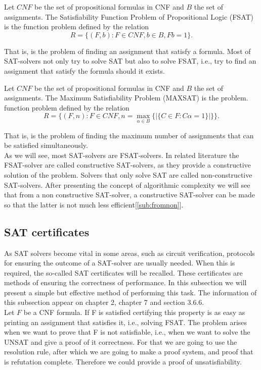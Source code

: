 \begin{definition}
  Let $CNF$ be the set of propositional formulas in CNF and $B$ the set of assignments.  The Satisfiability Function Problem of Propositional Logic (FSAT) is the function problem defined by the relation $$R=\{(F, b): F\in CNF, b \in B, Fb = 1\}.$$
\end{definition}
That is, is the problem of finding an assignment that satisfy a formula. Most of SAT-solvers not only try to solve SAT but also to solve FSAT, i.e., try to find an assignment that satisfy  the formula should it exists.
\begin{definition}
  Let $CNF$ be the set of propositional formulas in CNF and $B$ the set of assignments. The Maximum Satisfiability Problem (MAXSAT) is the problem. function problem defined by the relation $$R=\{(F,n) : F\in CNF, n = \max_{\alpha \in B}\{ | \{C\in F : C\alpha =1 \}| \}\}.$$
\end{definition}

That is, is the problem of finding the maximum number of assignments that can be satisfied simultaneously.\\

As we will see, most SAT-solvers are FSAT-solvers. In related literature the FSAT-solver are called constructive SAT-solvers, as they provide a constructive solution of the problem. Solvers that only solve SAT are called non-constructive SAT-solvers. After presenting the concept of algorithmic complexity we will see that from a non constructive SAT-solver, a constructive SAT-solver can be made so that the latter is not much less efficient[\ref{sub:fromnon}].


\subsection{SAT certificates}

As SAT solvers become vital in some areas, such as circuit verification, protocols for ensuring the outcome of a SAT-solver are usually needed. When this is required, the so-called SAT certificates will be recalled. These certificates are methods of ensuring the correctness of performance. In this subsection we will present a simple but effective method of performing this task. The information of this subsection appear on chapter 2\cite{schoning2013satisfiability}, chapter 7\cite{marek2009introduction} and section 3.6.6\cite{darwiche2009complete}.\\


Let $F$ be a CNF formula. If F is satisfied certifying this property is as easy as printing an assignment that satisfies it, i.e., solving FSAT. The problem arises when we want to prove that F is not satisfiable, i.e., when we want to solve the UNSAT and give a proof of it correctness. For that we are going to use the resolution rule, after which we are going to make a proof system, and proof that is refutation complete. Therefore we could provide a proof of unsatisfiability.

